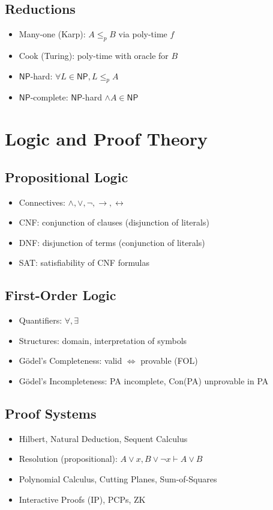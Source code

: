 \subsection{Reductions}
\begin{itemize}
\item Many-one (Karp): $A \le_p B$ via poly-time $f$
\item Cook (Turing): poly-time with oracle for $B$
\item $\mathsf{NP}$-hard: $\forall L \in \mathsf{NP}, L \le_p A$
\item $\mathsf{NP}$-complete: $\mathsf{NP}$-hard $\land A \in \mathsf{NP}$
\end{itemize}

\section{Logic and Proof Theory}

\subsection{Propositional Logic}
\begin{itemize}
\item Connectives: $\land, \lor, \neg, \to, \leftrightarrow$
\item CNF: conjunction of clauses (disjunction of literals)
\item DNF: disjunction of terms (conjunction of literals)
\item SAT: satisfiability of CNF formulas
\end{itemize}

\subsection{First-Order Logic}
\begin{itemize}
\item Quantifiers: $\forall, \exists$
\item Structures: domain, interpretation of symbols
\item Gödel's Completeness: valid $\iff$ provable (FOL)
\item Gödel's Incompleteness: PA incomplete, Con(PA) unprovable in PA
\end{itemize}

\subsection{Proof Systems}
\begin{itemize}
\item Hilbert, Natural Deduction, Sequent Calculus
\item Resolution (propositional): $A \lor x, B \lor \neg x \vdash A \lor B$
\item Polynomial Calculus, Cutting Planes, Sum-of-Squares
\item Interactive Proofs (IP), PCPs, ZK
\end{itemize}

